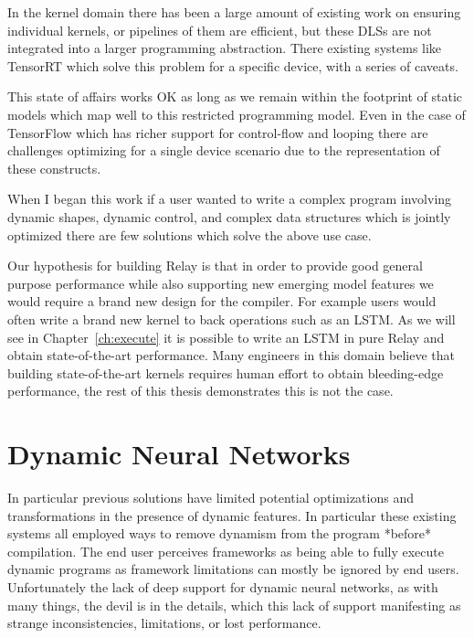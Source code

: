 In the kernel domain there has been a large amount of existing work on
  ensuring individual kernels, or pipelines of them are efficient,
  but these DLSs are not integrated into a larger programming abstraction.
There existing systems like TensorRT which solve this problem for a specific device,
  with a series of caveats.

This state of affairs works OK as long as we remain within the footprint of static
  models which map well to this restricted programming model.
Even in the case of TensorFlow which has richer support for control-flow and
  looping there are challenges optimizing for a single device scenario due
  to the representation of these constructs.

When I began this work if a user wanted to write a complex program involving dynamic shapes,
  dynamic control, and complex data structures which is jointly optimized there are few
  solutions which solve the above use case.

Our hypothesis for building Relay is that in order to provide good general
  purpose performance while also supporting new emerging model features
  we would require a brand new design for the compiler.
For example users would often write a brand new kernel to back operations such
  as an LSTM.
As we will see in Chapter~\ref{ch:execute} it is possible to write an LSTM in pure Relay
  and obtain state-of-the-art performance.
Many engineers in this domain believe that building state-of-the-art kernels requires
  human effort to obtain bleeding-edge performance, the rest of this thesis demonstrates
  this is not the case.

\section{Dynamic Neural Networks}

In particular previous solutions have limited potential optimizations
  and transformations in the presence of dynamic features.
In particular these existing systems all employed ways to remove
  dynamism from the program *before* compilation.
The end user perceives frameworks as being able to
  fully execute dynamic programs as framework limitations can mostly be ignored by end
  users.
Unfortunately the lack of deep support for dynamic neural networks,
  as with many things, the devil is in the details, which this lack
  of support manifesting as strange inconsistencies, limitations, or lost performance.

